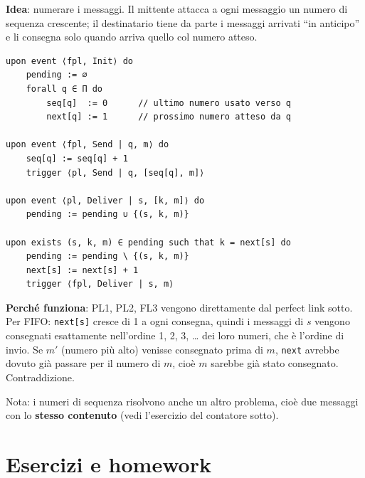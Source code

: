 \textbf{Idea}: numerare i messaggi. Il mittente attacca a ogni messaggio un numero di sequenza crescente; il destinatario tiene da parte i messaggi arrivati ``in anticipo'' e li consegna solo quando arriva quello col numero atteso.

\begin{verbatim}
upon event ⟨fpl, Init⟩ do
    pending := ∅
    forall q ∈ Π do
        seq[q]  := 0      // ultimo numero usato verso q
        next[q] := 1      // prossimo numero atteso da q

upon event ⟨fpl, Send | q, m⟩ do
    seq[q] := seq[q] + 1
    trigger ⟨pl, Send | q, [seq[q], m]⟩

upon event ⟨pl, Deliver | s, [k, m]⟩ do
    pending := pending ∪ {(s, k, m)}

upon exists (s, k, m) ∈ pending such that k = next[s] do
    pending := pending \ {(s, k, m)}
    next[s] := next[s] + 1
    trigger ⟨fpl, Deliver | s, m⟩
\end{verbatim}

\textbf{Perché funziona}: PL1, PL2, FL3 vengono direttamente dal perfect link sotto. Per FIFO: \texttt{next{[}s{]}} cresce di 1 a ogni consegna, quindi i messaggi di \(s\) vengono consegnati esattamente nell'ordine 1, 2, 3, \ldots{} dei loro numeri, che è l'ordine di invio. Se \(m'\) (numero più alto) venisse consegnato prima di \(m\), \texttt{next} avrebbe dovuto già passare per il numero di \(m\), cioè \(m\) sarebbe già stato consegnato. Contraddizione.

Nota: i numeri di sequenza risolvono anche un altro problema, cioè due messaggi con lo \textbf{stesso contenuto} (vedi l'esercizio del contatore sotto).

\section{Esercizi e homework}

